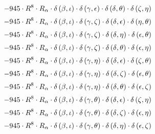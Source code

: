 \begin{subequations}
\begin{gather}
 \\[0.2em] \notag 		 - 945 \cdot R^{8} \cdot R_{\alpha{}} \cdot \delta{}\left(\beta{}, \iota{}\right) \cdot \delta{}\left(\gamma{}, \epsilon{}\right) \cdot \delta{}\left(\delta{}, \theta{}\right) \cdot \delta{}\left(\zeta{}, \eta{}\right) 
 \\[0.2em] \notag 		 - 945 \cdot R^{8} \cdot R_{\alpha{}} \cdot \delta{}\left(\beta{}, \iota{}\right) \cdot \delta{}\left(\gamma{}, \zeta{}\right) \cdot \delta{}\left(\delta{}, \epsilon{}\right) \cdot \delta{}\left(\eta{}, \theta{}\right) 
 \\[0.2em] \notag 		 - 945 \cdot R^{8} \cdot R_{\alpha{}} \cdot \delta{}\left(\beta{}, \iota{}\right) \cdot \delta{}\left(\gamma{}, \zeta{}\right) \cdot \delta{}\left(\delta{}, \eta{}\right) \cdot \delta{}\left(\epsilon{}, \theta{}\right) 
 \\[0.2em] \notag 		 - 945 \cdot R^{8} \cdot R_{\alpha{}} \cdot \delta{}\left(\beta{}, \iota{}\right) \cdot \delta{}\left(\gamma{}, \zeta{}\right) \cdot \delta{}\left(\delta{}, \theta{}\right) \cdot \delta{}\left(\epsilon{}, \eta{}\right) 
 \\[0.2em] \notag 		 - 945 \cdot R^{8} \cdot R_{\alpha{}} \cdot \delta{}\left(\beta{}, \iota{}\right) \cdot \delta{}\left(\gamma{}, \eta{}\right) \cdot \delta{}\left(\delta{}, \epsilon{}\right) \cdot \delta{}\left(\zeta{}, \theta{}\right) 
 \\[0.2em] \notag 		 - 945 \cdot R^{8} \cdot R_{\alpha{}} \cdot \delta{}\left(\beta{}, \iota{}\right) \cdot \delta{}\left(\gamma{}, \eta{}\right) \cdot \delta{}\left(\delta{}, \zeta{}\right) \cdot \delta{}\left(\epsilon{}, \theta{}\right) 
 \\[0.2em] \notag 		 - 945 \cdot R^{8} \cdot R_{\alpha{}} \cdot \delta{}\left(\beta{}, \iota{}\right) \cdot \delta{}\left(\gamma{}, \eta{}\right) \cdot \delta{}\left(\delta{}, \theta{}\right) \cdot \delta{}\left(\epsilon{}, \zeta{}\right) 
 \\[0.2em] \notag 		 - 945 \cdot R^{8} \cdot R_{\alpha{}} \cdot \delta{}\left(\beta{}, \iota{}\right) \cdot \delta{}\left(\gamma{}, \theta{}\right) \cdot \delta{}\left(\delta{}, \epsilon{}\right) \cdot \delta{}\left(\zeta{}, \eta{}\right) 
 \\[0.2em] \notag 		 - 945 \cdot R^{8} \cdot R_{\alpha{}} \cdot \delta{}\left(\beta{}, \iota{}\right) \cdot \delta{}\left(\gamma{}, \theta{}\right) \cdot \delta{}\left(\delta{}, \zeta{}\right) \cdot \delta{}\left(\epsilon{}, \eta{}\right) 
 \\[0.2em] \notag 		 - 945 \cdot R^{8} \cdot R_{\alpha{}} \cdot \delta{}\left(\beta{}, \iota{}\right) \cdot \delta{}\left(\gamma{}, \theta{}\right) \cdot \delta{}\left(\delta{}, \eta{}\right) \cdot \delta{}\left(\epsilon{}, \zeta{}\right) 

\end{gather}
\end{subequations}
